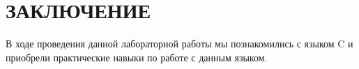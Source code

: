 \section*{ЗАКЛЮЧЕНИЕ}

В ходе проведения данной лабораторной работы мы познакомились с языком C и приобрели практические навыки по работе с данным языком.

\newpage